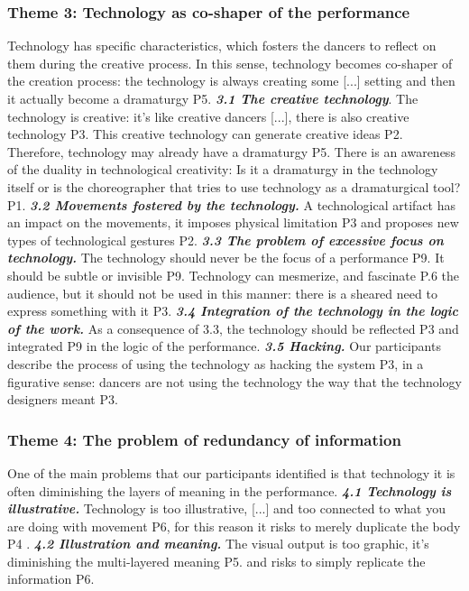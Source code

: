 \subsubsection{Theme 3: Technology as co-shaper of the performance}
Technology has specific characteristics, which fosters the dancers to reflect on them during the creative process. In this sense, technology becomes co-shaper of the creation process: { the technology is always creating some [...] setting and then it actually become a dramaturgy} P5. 
\textit{\textbf{3.1 The creative technology}}. The technology is creative: { it's like creative dancers [...], there is also creative technology} P3. This creative technology can { generate creative ideas} P2. Therefore, technology may already have a { dramaturgy} P5. There is an awareness of the duality in technological creativity: { Is it a dramaturgy in the technology itself or is the choreographer that tries to use technology as a dramaturgical tool?} P1. 
\textit{\textbf{3.2 Movements fostered by the technology.}} A technological artifact has an impact on the movements, it imposes  { physical limitation} P3 and proposes new types of
 { technological gestures}  P2.
\textbf{\textit{3.3 The problem of excessive focus on technology.}} The technology should never be the focus of a performance P9. It should be { subtle or invisible} P9. Technology can { mesmerize}, and { fascinate} P.6 the audience, but it should not be used in this manner: there is a sheared need to { express something with it} P3.
\textit{\textbf{3.4 Integration of the technology in the logic of the work.}} As a consequence of 3.3, the technology should be { reflected }P3  and { integrated} P9 in the logic of the performance.
\textbf{\textit{3.5 Hacking.}} Our participants describe the process of using the technology as  { hacking} the system P3, in a figurative sense: dancers are not { using the technology the way that the technology designers meant} P3.  

\subsubsection{Theme 4: The problem of redundancy of information} 
One of the main problems that our participants identified is that technology it is often diminishing the layers of meaning in the performance.
\textbf{\textit{4.1 Technology is illustrative.}}  Technology is { too illustrative, [...] and too connected to what you are doing with movement } P6, for this reason it risks to merely duplicate the body P4 .
\textit{\textbf{4.2 Illustration and meaning.}} The visual output is { too graphic, it’s diminishing the multi-layered meaning} P5. and risks to simply replicate the information P6.  

